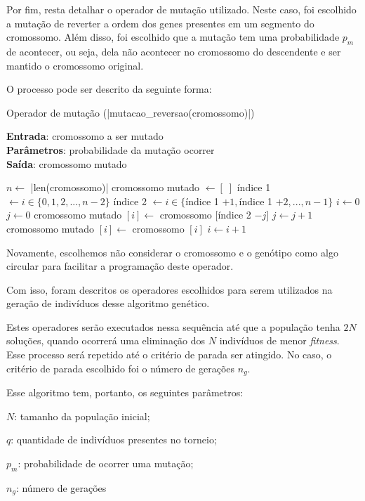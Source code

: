 \documentclass[a4paper, 12pt]{article}
\newenvironment{brprocess}[1][]
  {\begin{algorithm}[#1]
     \selectlanguage{brazilian}%
     \floatname{algorithm}{Processo}%
     \renewcommand{\algorithmicif}{\textbf{se}}%
     \renewcommand{\algorithmicfor}{\textbf{para}}%
     \renewcommand{\algorithmicdo}{\textbf{faça}}%
     \renewcommand{\algorithmicthen}{\textbf{faça}}%
     \renewcommand{\algorithmicend}{\textbf{fim}}%
     \renewcommand{\algorithmicwhile}{\textbf{enquanto}}%
     \renewcommand{\algorithmicelse}{\textbf{caso contrário}}%
  }
  {\end{algorithm}}
\begin{document}
Por fim, resta detalhar o operador de mutação utilizado. Neste caso, foi escolhido a mutação de reverter a ordem dos genes presentes em um segmento do cromossomo. Além disso, foi escolhido que a mutação tem uma probabilidade $p_m$ de acontecer, ou seja, dela não acontecer no cromossomo do descendente e ser mantido o cromossomo original.

O processo pode ser descrito da seguinte forma:
\begin{brprocess}[H]
    \caption{Operador de mutação (\Pverb|mutacao_reversao(cromossomo)|)}
    \textbf{Entrada}: cromossomo a ser mutado\\
    \textbf{Parâmetros}: probabilidade da mutação ocorrer\\
    \textbf{Saída}: cromossomo mutado
    \begin{algorithmic}
            \State $n \gets $ \Pverb|len(cromossomo)|
            \State cromossomo mutado $\gets [\;]$
            \State índice 1 $\gets i \in \{0, 1, 2, ..., n - 2\}$
            \State índice 2 $\gets i \in \{$índice 1 $+ 1, $índice 1 $+ 2, ..., n - 1\}$
            \State $i \gets 0$
            \State $j \gets 0$
                    \State cromossomo mutado $[i] \gets$ cromossomo $[$índice 2 $- j]$
                    \State $j \gets j + 1$
                \Else
                    \State cromossomo mutado $[i] \gets$ cromossomo $[i]$
                \EndIf
                \State$i \gets i + 1$
        \EndWhile
    \end{algorithmic}
\end{brprocess}

Novamente, escolhemos não considerar o cromossomo e o genótipo como algo circular para facilitar a programação deste operador.

Com isso, foram descritos os operadores escolhidos para serem utilizados na geração de indivíduos desse algoritmo genético.

Estes operadores serão executados nessa sequência até que a população tenha $2N$ soluções, quando ocorrerá uma eliminação dos $N$ indivíduos de menor \textit{fitness}. Esse processo será repetido até o critério de parada ser atingido. No caso, o critério de parada escolhido foi o número de gerações $n_g$.

Esse algoritmo tem, portanto, os seguintes parâmetros:
\begin{listing}
    \item $N$: tamanho da população inicial;
    \item $q$: quantidade de indivíduos presentes no torneio;
    \item $p_m$: probabilidade de ocorrer uma mutação;
    \item $n_g$: número de gerações
\end{listing}
\end{document}
